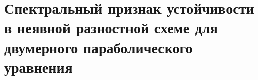 \documentclass[__main__.tex]{subfiles}
\begin{document}
\section{Спектральный признак устойчивости в неявной разностной схеме для двумерного параболического уравнения}
\end{document}
